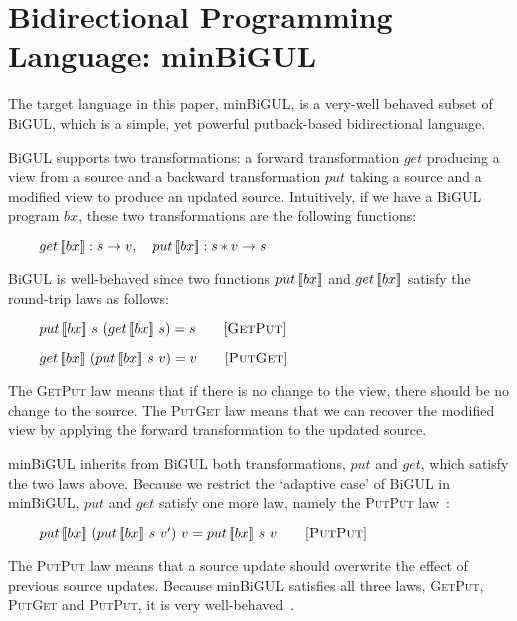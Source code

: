 \section{Bidirectional Programming Language: minBiGUL} \label{sect:minbigul}

The target language in this paper, minBiGUL, is a very-well behaved subset of BiGUL, which is a simple, yet powerful putback-based bidirectional language. 

BiGUL supports two transformations: a forward transformation $get$ producing a view from a source and a backward transformation $put$ taking a source and a modified view to produce an updated source. Intuitively, if we have a BiGUL program $bx$, these two transformations are the following functions:

 \smallvspace
    $\hspace*{3mm} \ \quad get \, [\![bx]\!] : s \to v, \quad put \, [\![bx]\!] : s * v \to s$
 \smallvspace
 
BiGUL is well-behaved \cite{Pacheco:2014:MCP:2543728.2543737} since two functions $put \, [\![bx]\!]$ and $get \, [\![bx]\!]$ satisfy the round-trip laws as follows:

\smallvspace
    $\hspace*{3mm} \ \quad put \, [\![bx]\!] \ s \ (get \, [\![bx]\!] \ s) = s \qquad [\textsc{GetPut}]$
    
    $\hspace*{3mm} \ \quad get \, [\![bx]\!] \ (put \, [\![bx]\!] \ s \ v) = v \qquad [\textsc{PutGet}]$
\smallvspace

\noindent The \textsc{GetPut} law means that if there is no change to the view, there should be no change to the source. The \textsc{PutGet} law means that we can recover the modified view by applying the forward transformation to the updated source.

minBiGUL inherits from BiGUL both 
transformations, $put$ and $get$, which satisfy the two laws above. 
Because we restrict the `adaptive case' of BiGUL in minBiGUL,
$put$ and $get$ satisfy one more law, namely the \textsc{PutPut} law~\cite{Foster:2007:CBT:1232420.1232424}:

\smallvspace
$\hspace*{3mm} \ \quad put \, [\![bx]\!] \ (put \, [\![bx]\!] \ s \ v') \ v = put \, [\![bx]\!] \ s \ v \qquad [\textsc{PutPut}]$
\smallvspace

\noindent The \textsc{PutPut} law means that a source update should overwrite the effect of previous source updates. 
Because minBiGUL satisfies all three laws, \textsc{GetPut}, \textsc{PutGet} and \textsc{PutPut}, it is very well-behaved~\cite{Foster:2007:CBT:1232420.1232424}.

